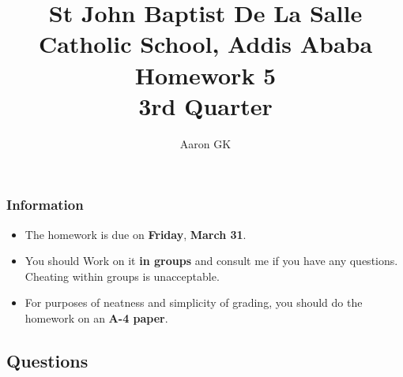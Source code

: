\documentclass[9pt,addpoints]{exam}
\author{Aaron GK}
\begin{document}
	\title{St John Baptist De La Salle Catholic School, Addis Ababa\\
		\large Homework 5 \\
		3rd Quarter}
	\maketitle
	\begin{center}
		\subsubsection*{Information}
		\begin{itemize}
			\item The homework is due on \textbf{Friday}, \textbf{March 31}.
			\item You should Work on it \textbf{in groups} and consult me if you have any questions. Cheating within groups is unacceptable.
			\item For purposes of neatness and simplicity of grading, you should do the homework on an \textbf{A-4 paper}.
		\end{itemize}
	\end{center}
	\begin{center}
		\subsection*{Questions}
	\end{center}
\end{document}
